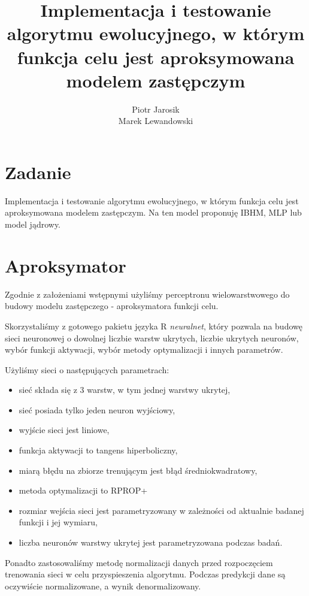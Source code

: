 \documentclass[12pt, a4paper]{article}
\title{\textbf{Implementacja i testowanie algorytmu ewolucyjnego, w którym funkcja celu jest 
aproksymowana modelem zastępczym}}
\author{Piotr Jarosik \\ Marek Lewandowski}
\date{}
\begin{document}
\maketitle

\section{Zadanie}
Implementacja i testowanie algorytmu ewolucyjnego, w którym funkcja celu jest aproksymowana modelem 
zastępczym. Na ten model proponuję IBHM, MLP lub model jądrowy.

\section{Aproksymator}
Zgodnie z założeniami wstępnymi użyliśmy perceptronu wielowarstwowego do 
budowy modelu zastępczego - aproksymatora funkcji celu. 

Skorzystaliśmy z gotowego pakietu języka R \emph{neuralnet}, który pozwala na budowę 
sieci neuronowej o dowolnej liczbie warstw ukrytych, liczbie ukrytych neuronów, wybór funkcji aktywacji, 
wybór metody optymalizacji i innych parametrów.

Użyliśmy sieci o następujących parametrach:
\begin{itemize}
\item sieć składa się z 3 warstw, w tym jednej warstwy ukrytej,
\item sieć posiada tylko jeden neuron wyjściowy,
\item wyjście sieci jest liniowe,
\item funkcja aktywacji to tangens hiperboliczny,
\item miarą błędu na zbiorze trenującym jest błąd średniokwadratowy,
\item metoda optymalizacji to RPROP+\cite{Riedmiller93adirect}
\item rozmiar wejścia sieci jest parametryzowany w zależności od aktualnie badanej funkcji i jej wymiaru,
\item liczba neuronów warstwy ukrytej jest parametryzowana podczas badań.
\end{itemize}

Ponadto zastosowaliśmy metodę normalizacji danych przed rozpoczęciem trenowania sieci w celu przyspieszenia algorytmu. Podczas predykcji dane są oczywiście normalizowane, a wynik denormalizowany.

\nocite{*}


\end{document}
